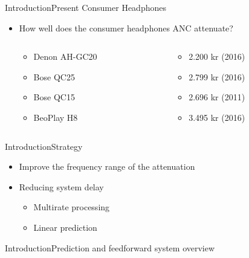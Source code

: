 \begin{frame}{Introduction}{Present Consumer Headphones}
	\begin{itemize}	
	\item How well does the consumer headphones ANC attenuate?
	\begin{columns}
		\begin{column}{0.27\textwidth}
		\begin{itemize}
			\item Denon AH-GC20
			\item Bose QC25 
			\item Bose QC15 	
			\item BeoPlay H8 	
		\end{itemize}
		\end{column}
		\begin{column}{0.6\textwidth} 
		\begin{itemize}
			\item[] 2.200 kr (2016)
			\item[] 2.799 kr (2016)
			\item[] 2.696 kr (2011)
			\item[] 3.495 kr (2016)
		\end{itemize}
		\end{column}
	\end{columns}
	\end{itemize}			
	\begin{center}
		
	\end{center}	
\end{frame}


\begin{frame}{Introduction}{Strategy}
	\begin{center}
	\begin{itemize}
		\item Improve the frequency range of the attenuation
		\item Reducing system delay
		\begin{itemize}	
		\item Multirate processing
		\item Linear prediction
		\end{itemize}				
	\end{itemize}
	\end{center}
\end{frame}

\begin{frame}{Introduction}{Prediction and feedforward system overview}
	\begin{center}

	\end{center}
\end{frame}
